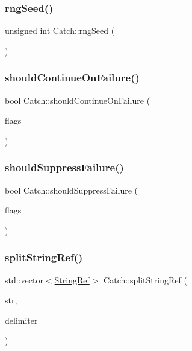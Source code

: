 \mbox{\label{namespace_catch_acf5ea05e942d2d7fe79111e12754ed76}} 
\subsubsection{\texorpdfstring{rng\+Seed()}{rngSeed()}}
{\footnotesize\ttfamily unsigned int Catch\+::rng\+Seed (\begin{DoxyParamCaption}{ }\end{DoxyParamCaption})}

\mbox{\label{namespace_catch_a7f7480b15d74965459c844f0d393ed87}} 
\subsubsection{\texorpdfstring{should\+Continue\+On\+Failure()}{shouldContinueOnFailure()}}
{\footnotesize\ttfamily bool Catch\+::should\+Continue\+On\+Failure (\begin{DoxyParamCaption}\item[{int}]{flags }\end{DoxyParamCaption})}

\mbox{\label{namespace_catch_ab91eb13081203d634fe48d3d2ab386d7}} 
\subsubsection{\texorpdfstring{should\+Suppress\+Failure()}{shouldSuppressFailure()}}
{\footnotesize\ttfamily bool Catch\+::should\+Suppress\+Failure (\begin{DoxyParamCaption}\item[{int}]{flags }\end{DoxyParamCaption})}

\mbox{\label{namespace_catch_a35ef4c6329ab86a47243c25a58274109}} 
\subsubsection{\texorpdfstring{split\+String\+Ref()}{splitStringRef()}}
{\footnotesize\ttfamily std\+::vector$<$\mbox{\hyperlink{class_catch_1_1_string_ref}{String\+Ref}}$>$ Catch\+::split\+String\+Ref (\begin{DoxyParamCaption}\item[{\mbox{\hyperlink{class_catch_1_1_string_ref}{String\+Ref}}}]{str,  }\item[{char}]{delimiter }\end{DoxyParamCaption})}

